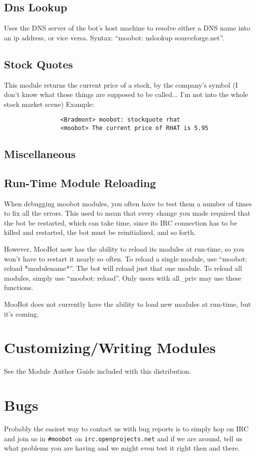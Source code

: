 \documentclass[titlepage]{article}
\begin{document}
		\subsection{Dns Lookup}
			Uses the DNS server of the bot's host machine to resolve
			either a DNS  name into an ip address, or vice versa.
			Syntax:  ``moobot: nslookup sourceforge.net''.
		\subsection{Stock Quotes}
			This module returns the current price of a stock, by the
			company's symbol (I don't know what those things are supposed
			to be called...  I'm not into the whole stock market scene)
			Example:
			\begin{verbatim}
				<Bradmont> moobot: stockquote rhat
				<moobot> The current price of RHAT is 5.95
			\end{verbatim}
	
	\subsection{Miscellaneous}
		\subsection{Run-Time Module Reloading}
			When debugging moobot modules, you often have to test them
			a number of times to fix all the errors.  This used to mean
			that every change you made required that the bot be restarted,
			which can take time, since its IRC connection has to be killed
			and restarted, the bot must be reinitialized, and so forth.

			However, MooBot now has the ability to reload its modules at
			run-time, so you won't have to restart it nearly so often.
			To reload a single module, use ``moobot: reload *modulename*''.
			The bot will reload just that one module.  To reload all modules,
			simply use ``moobot: reload''.  Only users with all\_priv may
			use these functions.

			MooBot does not currently have the ability to load new modules
			at run-time, but it's coming.

	\section{Customizing/Writing Modules}
		See the Module Author Guide included with this distribution.

	\section{Bugs}
		Probably the easiest way to contact us with bug reports is to simply
		hop on IRC and join us in \texttt{\#moobot} on
		\texttt{irc.openprojects.net} and if we are around, tell us what
		problems you are having and we might even test it right then and there.
\end{document}
